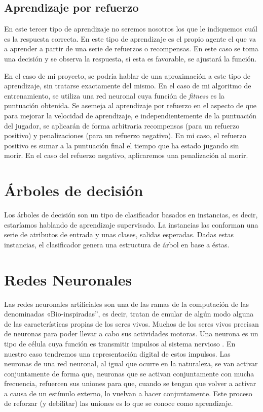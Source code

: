 \subsection{Aprendizaje por refuerzo}

En este tercer tipo de aprendizaje no seremos nosotros los que le indiquemos cuál es la respuesta correcta. En este tipo de aprendizaje es el propio agente el que va a aprender a partir de una serie de refuerzos o recompensas. En este caso se toma una decisión y se observa la respuesta, si esta es favorable, se ajustará la función. 

En el caso de mi proyecto, se podría hablar de una aproximación a este tipo de aprendizaje, sin tratarse exactamente del mismo. En el caso de mi algoritmo de entrenamiento, se utiliza una red neuronal cuya función de \emph{fitness} es la puntuación obtenida. Se asemeja al aprendizaje por refuerzo en el aspecto de que para mejorar la velocidad de aprendizaje, e independientemente de la puntuación del jugador, se aplicarán de forma arbitraria recompensas (para un refuerzo positivo) y penalizaciones (para un refuerzo negativo). En mi caso, el refuerzo positivo es sumar a la puntuación final el tiempo que ha estado jugando sin morir. En el caso del refuerzo negativo, aplicaremos una penalización al morir.


\section{Árboles de decisión}
Los árboles de decisión son un tipo de clasificador basados en instancias, es decir, estaríamos hablando de aprendizaje supervisado. La instancias las conforman una serie de atributos de entrada y unas clases, salidas esperadas. Dadas estas instancias, el clasificador genera una estructura de árbol en base a éstas.





\section{Redes Neuronales}
Las redes neuronales artificiales son una de las ramas de la computación de las denominadas «Bio-inspiradas'', es decir, tratan de emular de algún modo alguna de las características propias de los seres vivos. Muchos de los seres vivos precisan de neuronas para poder llevar a cabo sus actividades motoras. Una neurona es un tipo de célula cuya función es transmitir impulsos al sistema nervioso \cite{wiki:neurona}. En nuestro caso tendremos una representación digital de estos impulsos. Las neuronas de una red neuronal, al igual que ocurre en la naturaleza, se van activar conjuntamente  de forma que, neuronas que se activan conjuntamente con mucha frecuencia, refuercen sus uniones para que, cuando se tengan que volver a activar a causa de un estímulo externo, lo vuelvan a hacer conjuntamente. Este proceso de reforzar (y debilitar) las uniones es lo que se conoce como aprendizaje.


